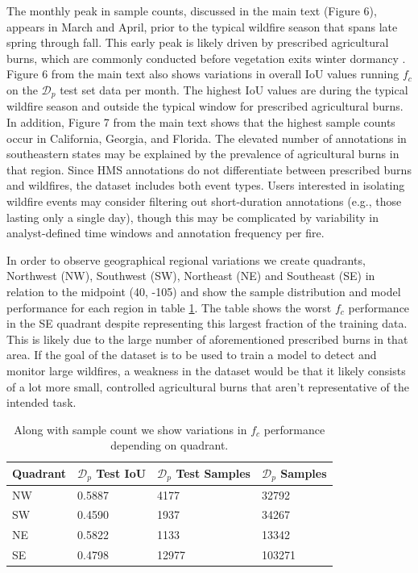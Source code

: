 \documentclass{article}
\begin{document}
The monthly peak in sample counts, discussed in the main text (Figure 6), appears in March and April, prior to the typical wildfire season that spans late spring through fall. This early peak is likely driven by prescribed agricultural burns, which are commonly conducted before vegetation exits winter dormancy \cite{ag_fire}. Figure 6 from the main text also shows variations in overall IoU values running \(f_{c}\) on the \(\mathcal{D}_p\) test set data per month. The highest IoU values are during the typical wildfire season and outside the typical window for prescribed agricultural burns. In addition, Figure 7 from the main text shows that the highest sample counts occur in California, Georgia, and Florida. The elevated number of annotations in southeastern states may be explained by the prevalence of agricultural burns in that region. Since HMS annotations do not differentiate between prescribed burns and wildfires, the dataset includes both event types. Users interested in isolating wildfire events may consider filtering out short-duration annotations (e.g., those lasting only a single day), though this may be complicated by variability in analyst-defined time windows and annotation frequency per fire.

In order to observe geographical regional variations we create quadrants, Northwest (NW), Southwest (SW), Northeast (NE) and Southeast (SE) in relation to the midpoint (40, -105) and show the sample distribution and model performance for each region in table \ref{quad}. The table shows the worst \(f_c\) performance in the SE quadrant despite representing this largest fraction of the training data. This is likely due to the large number of aforementioned prescribed burns in that area. If the goal of the dataset is to be used to train a model to detect and monitor large wildfires, a weakness in the dataset would be that it likely consists of a lot more small, controlled agricultural burns that aren't representative of the intended task. 

\begin{table}
    \caption{Along with sample count we show variations in \(f_{c}\) performance depending on quadrant.}
  \label{quad}
  \centering
  \begin{tabular}{llll}
    \toprule
    Quadrant & \(\mathcal{D}_p\) Test IoU & \(\mathcal{D}_p\) Test Samples & \(\mathcal{D}_p\) Samples \\
    \midrule
    NW & 0.5887 & 4177 & 32792\\
    SW & 0.4590 & 1937 & 34267\\
    NE & 0.5822 & 1133   & 13342\\
    SE & 0.4798 & 12977 & 103271 \\
    \bottomrule
  \end{tabular}
\end{table}
\end{document}
